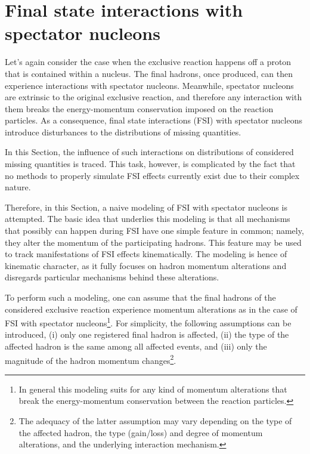 \section{Final state interactions with spectator nucleons}
\mbox{}\vspace{-\baselineskip}
\label{sec:fsi}

Let's again consider the case when the exclusive reaction happens off a proton that is contained within a nucleus. The final hadrons, once produced, can then experience interactions with spectator nucleons. Meanwhile, spectator nucleons are extrinsic to the original exclusive reaction, and therefore any interaction with them breaks the energy-momentum conservation imposed on the reaction particles. As a consequence, final state interactions (FSI) with spectator nucleons introduce disturbances to the distributions of missing quantities.


In this Section, the influence of such interactions on distributions of considered missing quantities is traced. This task, however, is complicated by 
the fact that no methods to properly simulate FSI effects currently exist due to their complex nature. 


Therefore, in this Section, a naive modeling of FSI with spectator nucleons is attempted. The basic idea that underlies this modeling is that all mechanisms that possibly can happen during FSI have one simple feature in common; namely, they alter the momentum of the participating hadrons. 
This feature may be used to track manifestations of FSI effects kinematically. The modeling is hence of kinematic character, as it fully focuses on hadron momentum alterations and disregards particular mechanisms behind these alterations.



To perform such a modeling, one can assume that the final hadrons of the considered exclusive reaction experience momentum alterations as in the case of FSI with spectator nucleons\footnote[5]{In general this modeling suits for any kind of momentum alterations that break the energy-momentum conservation between the reaction particles.}. For simplicity, the following assumptions can be introduced, (i) only one registered final hadron is affected, (ii) the type of the affected hadron is the same among all affected events, and (iii) only the magnitude of the hadron momentum changes\footnote[6]{The adequacy of the latter assumption may vary depending on the type of the affected hadron, the type (gain/loss) and degree of momentum alterations, and the underlying interaction mechanism.}.


